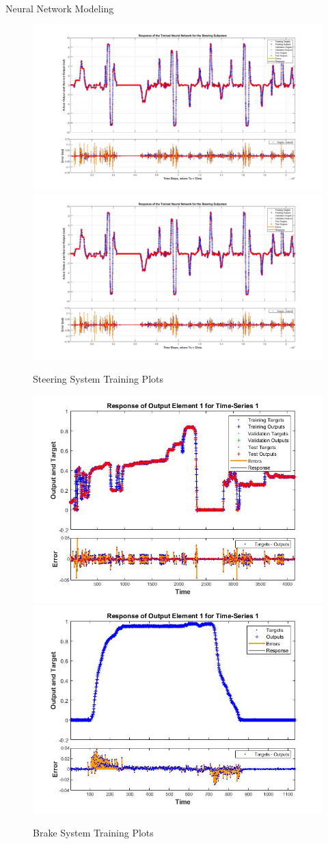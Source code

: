 \documentclass[final]{beamer}
\newlength{\onecolwid}
\begin{document}
\begin{frame}[t]
\begin{columns}[t]
\begin{column}{\onecolwid}
\begin{alertblock}{Neural Network Modeling}
\begin{figure}
    \centering
		{\includegraphics[width=0.48\linewidth]{figs/img/steeringNeuralNetworkTrainedOutput}}
		{\includegraphics[width=0.48\linewidth]{figs/img/steeringNeuralNetworkTrainedOutput}}
	\caption{ Steering System Training Plots}
    \label{fig:SteeringSysNeuralNetwork}
\end{figure}


\begin{figure}
    \centering
		{\includegraphics[width=0.48\linewidth]{figs/img/brake_new_neuralNetworkFig}}
		{\includegraphics[width=0.48\linewidth]{figs/img/brake_new_neuralNetworkFigLog2Test}}
	\caption{ Brake System Training Plots}
    \label{fig:BrakeSysNeuralNetwork}
\end{figure}



\end{alertblock}
\end{column}
\end{columns}
\end{frame}
\end{document}
